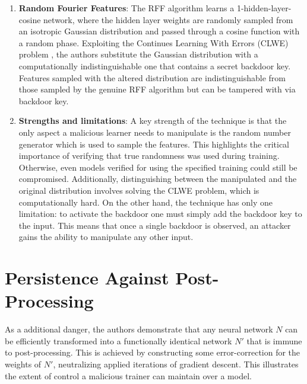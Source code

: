 \documentclass[
	fontsize=12pt,
	headings=small,
	parskip=quarter,
	bibliography=totoc,
	numbers=noenddot,       
	open=any,               
 	final                   
]{scrreprt}
\begin{document}
\begin{enumerate} \itemsep -5pt
	\item \textbf{Random Fourier Features}: The RFF algorithm learns a 1-hidden-layer-cosine network, where the hidden layer weights are randomly sampled from an isotropic Gaussian distribution and passed through a cosine function with a random phase. Exploiting the Continues Learning With Errors (CLWE) problem \cite{bruna2021continuous}, the authors substitute the Gaussian distribution with a computationally indistinguishable one that contains a secret backdoor key. Features sampled with the altered distribution are indistinguishable from those sampled by the genuine RFF algorithm but can be tampered with via backdoor key.
	\item \textbf{Strengths and limitations}: A key strength of the technique is that the only aspect a malicious learner needs to manipulate is the random number generator which is used to sample the features. This highlights the critical importance of verifying that true randomness was used during training. Otherwise, even models verified for using the specified training could still be compromised. Additionally, distinguishing between the manipulated and the original distribution involves solving the CLWE problem, which is computationally hard. On the other hand, the technique has only one limitation: to activate the backdoor one must simply add the backdoor key to the input. This means that once a single backdoor is observed, an attacker gains the ability to manipulate any other input.
\end{enumerate}



\section{Persistence Against Post-Processing}
As a additional danger, the authors demonstrate that any neural network $N$ can be efficiently transformed into a functionally identical network $N'$ that is immune to post-processing. This is achieved by constructing some error-correction for the weights of $N'$, neutralizing applied iterations of gradient descent. This illustrates the extent of control a malicious trainer can maintain over a model.  
\end{document}
